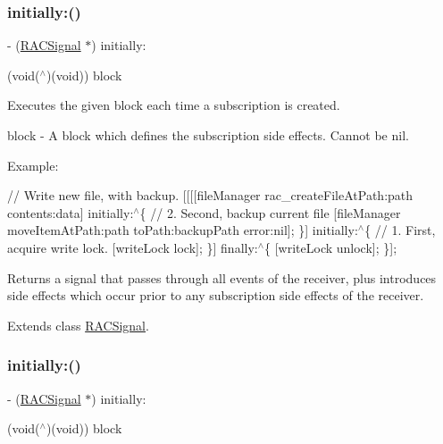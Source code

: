\subsubsection{\texorpdfstring{initially\+:()}{initially:()}\hspace{0.1cm}{\footnotesize\ttfamily [2/3]}}
{\footnotesize\ttfamily -\/ (\mbox{\hyperlink{interface_r_a_c_signal}{R\+A\+C\+Signal}} $\ast$) initially\+: \begin{DoxyParamCaption}\item[{(void($^\wedge$)(void))}]{block }\end{DoxyParamCaption}}

Executes the given block each time a subscription is created.

block -\/ A block which defines the subscription side effects. Cannot be {\ttfamily nil}.

Example\+:

// Write new file, with backup. \mbox{[}\mbox{[}\mbox{[}\mbox{[}file\+Manager rac\+\_\+create\+File\+At\+Path\+:path contents\+:data\mbox{]} initially\+:$^\wedge$\{ // 2. Second, backup current file \mbox{[}file\+Manager move\+Item\+At\+Path\+:path to\+Path\+:backup\+Path error\+:nil\mbox{]}; \}\mbox{]} initially\+:$^\wedge$\{ // 1. First, acquire write lock. \mbox{[}write\+Lock lock\mbox{]}; \}\mbox{]} finally\+:$^\wedge$\{ \mbox{[}write\+Lock unlock\mbox{]}; \}\mbox{]};

Returns a signal that passes through all events of the receiver, plus introduces side effects which occur prior to any subscription side effects of the receiver. 

Extends class \mbox{\hyperlink{interface_r_a_c_signal_a2c8566a5d3b5997357d34ee5991a2e0c}{R\+A\+C\+Signal}}.

\mbox{\label{category_r_a_c_signal_07_operations_08_a2c8566a5d3b5997357d34ee5991a2e0c}} 
\subsubsection{\texorpdfstring{initially\+:()}{initially:()}\hspace{0.1cm}{\footnotesize\ttfamily [3/3]}}
{\footnotesize\ttfamily -\/ (\mbox{\hyperlink{interface_r_a_c_signal}{R\+A\+C\+Signal}} $\ast$) initially\+: \begin{DoxyParamCaption}\item[{(void($^\wedge$)(void))}]{block }\end{DoxyParamCaption}}


